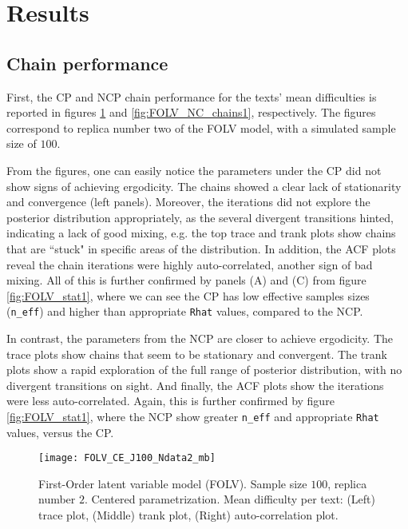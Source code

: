 
\section{Results}

\subsection{Chain performance}

First, the CP and NCP chain performance for the texts' mean difficulties is reported in figures \ref{fig:FOLV_CE_chains1} and \ref{fig:FOLV_NC_chains1}, respectively. The figures correspond to replica number two of the FOLV model, with a simulated sample size of $100$. 

From the figures, one can easily notice the parameters under the CP did not show signs of achieving ergodicity. The chains showed a clear lack of stationarity and convergence (left panels). Moreover, the iterations did not explore the posterior distribution appropriately, as the several divergent transitions hinted, indicating a lack of good mixing, e.g. the top trace and trank plots show chains that are ``stuck" in specific areas of the distribution. In addition, the ACF plots reveal the chain iterations were highly auto-correlated, another sign of bad mixing. All of this is further confirmed by panels (A) and (C) from figure \ref{fig:FOLV_stat1}, where we can see the CP has low effective samples sizes (\texttt{n\_eff}) and higher than appropriate \texttt{Rhat} values, compared to the NCP.

In contrast, the parameters from the NCP are closer to achieve ergodicity. The trace plots show chains that seem to be stationary and convergent. The trank plots show a rapid exploration of the full range of posterior distribution, with no divergent transitions on sight. And finally, the ACF plots show the iterations were less auto-correlated. Again, this is further confirmed by figure \ref{fig:FOLV_stat1}, where the NCP show greater \texttt{n\_eff} and appropriate \texttt{Rhat} values, versus the CP.
%
\begin{figure}[H]
	\centering
	\texttt{[image: FOLV\_CE\_J100\_Ndata2\_mb]}
	\caption[First-Order latent variable model (FOLV). Sample size $100$, replica number $2$. Centered parametrization. Mean difficulty per text. Trace, trank and auto-correlation plots.]%
	{First-Order latent variable model (FOLV). Sample size $100$, replica number $2$. Centered parametrization. Mean difficulty per text: (Left) trace plot, (Middle) trank plot, (Right) auto-correlation plot.}
	\label{fig:FOLV_CE_chains1}
\end{figure}


